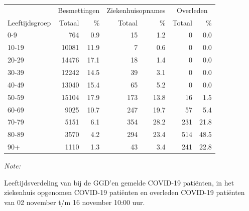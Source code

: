 \documentclass[
  english,
  man,floatsintext]{apa6}
\begin{document}
\begin{table}[H]
\centering\begingroup\fontsize{11}{13}\selectfont

\begin{threeparttable}
\begin{tabular}{lrrrrrr}
\toprule
\multicolumn{1}{c}{ } & \multicolumn{2}{c}{Besmettingen} & \multicolumn{2}{c}{Ziekenhuisopnames} & \multicolumn{2}{c}{Overleden} \\
\cmidrule(l{3pt}r{3pt}){2-3} \cmidrule(l{3pt}r{3pt}){4-5} \cmidrule(l{3pt}r{3pt}){6-7}
Leeftijdsgroep & Totaal & \% & Totaal & \% & Totaal & \%\\
\midrule
0-9 & 764 & 0.9 & 15 & 1.2 & 0 & 0.0\\
10-19 & 10081 & 11.9 & 7 & 0.6 & 0 & 0.0\\
20-29 & 14476 & 17.1 & 18 & 1.4 & 0 & 0.0\\
30-39 & 12242 & 14.5 & 39 & 3.1 & 0 & 0.0\\
40-49 & 13040 & 15.4 & 65 & 5.2 & 0 & 0.0\\
50-59 & 15104 & 17.9 & 173 & 13.8 & 16 & 1.5\\
60-69 & 9025 & 10.7 & 247 & 19.7 & 57 & 5.4\\
70-79 & 5151 & 6.1 & 354 & 28.2 & 231 & 21.8\\
80-89 & 3570 & 4.2 & 294 & 23.4 & 514 & 48.5\\
90+ & 1110 & 1.3 & 43 & 3.4 & 241 & 22.8\\
\bottomrule
\end{tabular}
\begin{tablenotes}
\item \textit{Note: } 
\item Leeftijdsverdeling van bij de GGD’en gemelde COVID-19 patiënten, in het ziekenhuis opgenomen COVID-19 patiënten en overleden COVID-19 patiënten van 02 november t/m 16 november 10:00 uur.
\end{tablenotes}
\end{threeparttable}
\endgroup{}
\end{table}
\end{document}
